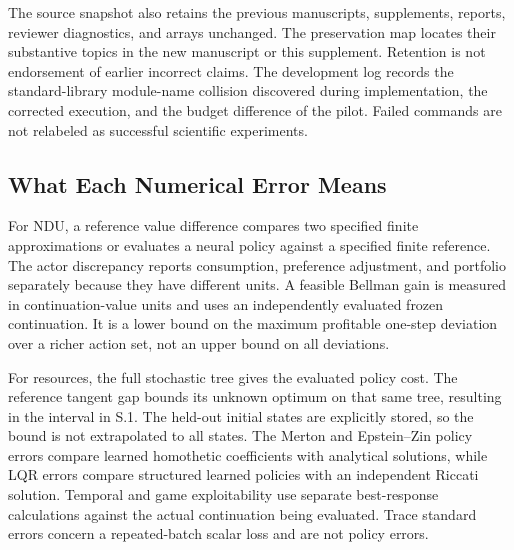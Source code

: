 The source snapshot also retains the previous manuscripts, supplements, reports, reviewer diagnostics, and arrays unchanged. The preservation map locates their substantive topics in the new manuscript or this supplement. Retention is not endorsement of earlier incorrect claims. The development log records the standard-library module-name collision discovered during implementation, the corrected execution, and the budget difference of the pilot. Failed commands are not relabeled as successful scientific experiments.

\subsection{What Each Numerical Error Means}
For NDU, a reference value difference compares two specified finite approximations or evaluates a neural policy against a specified finite reference. The actor discrepancy reports consumption, preference adjustment, and portfolio separately because they have different units. A feasible Bellman gain is measured in continuation-value units and uses an independently evaluated frozen continuation. It is a lower bound on the maximum profitable one-step deviation over a richer action set, not an upper bound on all deviations.

For resources, the full stochastic tree gives the evaluated policy cost. The reference tangent gap bounds its unknown optimum on that same tree, resulting in the interval in S.1. The held-out initial states are explicitly stored, so the bound is not extrapolated to all states. The Merton and Epstein--Zin policy errors compare learned homothetic coefficients with analytical solutions, while LQR errors compare structured learned policies with an independent Riccati solution. Temporal and game exploitability use separate best-response calculations against the actual continuation being evaluated. Trace standard errors concern a repeated-batch scalar loss and are not policy errors.
